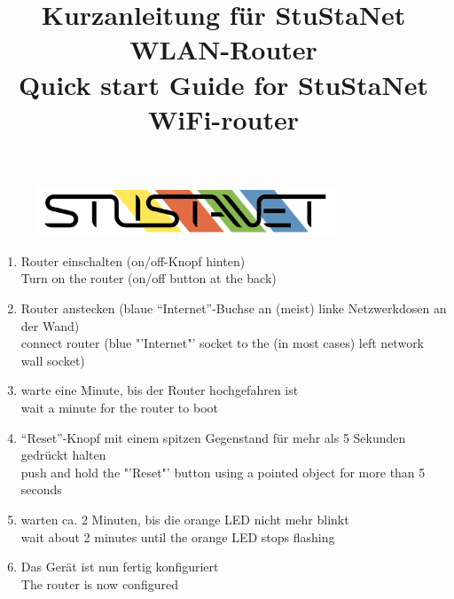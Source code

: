 \documentclass[a4paper,11pt]{scrartcl}
\title{Kurzanleitung für StuStaNet WLAN-Router\\Quick start Guide for StuStaNet WiFi-router}
\date{}
\begin{document}
	
\maketitle

\begin{figure}[t!]
	\centering
	\vspace{-20pt}
	\includegraphics[width=0.8\textwidth,keepaspectratio]{Bilder/StuStaNet_Logo}
	\vspace{-50pt}
\end{figure}

\vspace{-70pt}


\begin{enumerate}
	\item Router einschalten (on/off-Knopf hinten)\\
	Turn on the router (on/off button at the back)
	\item Router anstecken (blaue "`Internet"'-Buchse an (meist) linke Netzwerkdosen an der Wand)\\
	connect router (blue "'Internet"' socket to the (in most cases) left network wall socket)
	\item warte eine Minute, bis der Router hochgefahren ist\\
	wait a minute for the router to boot
	\item "`Reset"'-Knopf mit einem spitzen Gegenstand für mehr als 5 Sekunden gedrückt halten\\
	push and hold the "'Reset"' button using a pointed object for more than 5 seconds
	\item warten ca. 2 Minuten, bis die orange LED nicht mehr blinkt\\
	wait about 2 minutes until the orange LED stops flashing
	\item Das Gerät ist nun fertig konfiguriert\\
	The router is now configured\\[1em]
\end{enumerate}
\end{document}
